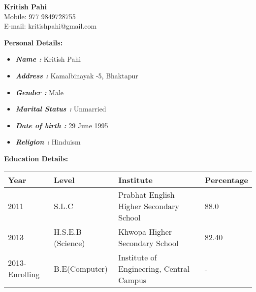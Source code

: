 \documentclass[paper = a4paper, 12pt]{article}
\begin{document}
\pagestyle{empty}

{\Huge
	\textbf{Kritish Pahi} \\
	\small{Mobile: 977 9849728755}\\
	\small{E-mail: kritishpahi@gmail.com}\\

	
}

{ \Large \textbf{Personal Details:}
}
\begin{itemize}\addtolength{\leftskip}{8mm}

	\item \textbf{\emph{Name :}} Kritish Pahi
	\item \textbf{\emph{Address :}} Kamalbinayak -5, Bhaktapur
	\item \textbf{\emph{Gender :}} Male
	\item \textbf{\emph{Marital Status :}} Unmarried
	\item \textbf{\emph{Date of birth :}} 29 June 1995
	\item \textbf{\emph{Religion :}} Hinduism
\end{itemize}

{\Large \textbf{ Education Details: } \\
}
\begin{tabular}{l l l l}
	\textbf{Year} & \textbf{Level} & \textbf{Institute} & \textbf{Percentage} \\ \hline
	2011 & S.L.C & Prabhat English Higher Secondary School & 88.0 \\ \hline
	2013 & H.S.E.B (Science) & Khwopa Higher Secondary School & 82.40 \\ \hline
	2013-Enrolling & B.E(Computer) & Institute of Engineering, Central Campus & - \\ \hline



\end{tabular}
\end{document}
